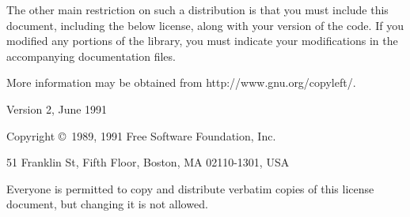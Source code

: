 \documentclass[twoside,letterpaper,11pt]{article}
\begin{document}
The other main restriction on such a distribution is that you must include this 
document,
including the below license, along with your version of the code.  If you modified
any portions of the library, you must indicate your modifications in the accompanying
documentation files.

More information may be obtained from http://www.gnu.org/copyleft/.

\begin{center}
{\parindent 0in

Version 2, June 1991

Copyright \copyright\ 1989, 1991 Free Software Foundation, Inc.

\bigskip

51 Franklin St, Fifth Floor, Boston, MA  02110-1301, USA

\bigskip

Everyone is permitted to copy and distribute verbatim copies
of this license document, but changing it is not allowed.
}
\end{center}
\end{document}
